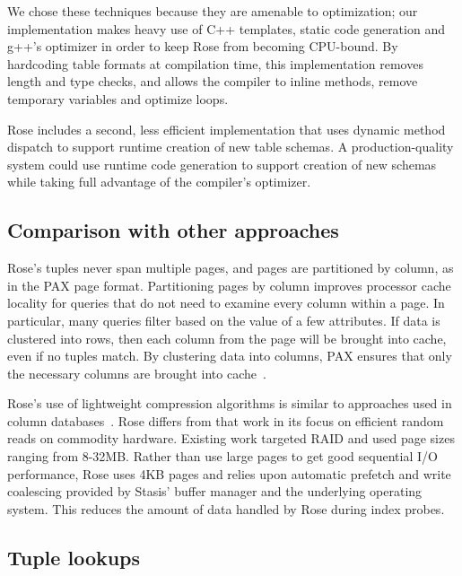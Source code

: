 \documentclass{vldb}
\newcommand{\rows}{Rose\xspace}
\newcommand{\rowss}{Rose's\xspace}
\begin{document}
We chose these techniques because they are amenable to optimization;
our implementation makes heavy use of C++ templates, static code
generation and g++'s optimizer in order to keep \rows from becoming
CPU-bound.  By hardcoding table formats at compilation time, this
implementation removes length and type checks, and allows the compiler
to inline methods, remove temporary variables and optimize loops.

\rows includes a second, less efficient implementation that uses
dynamic method dispatch to support runtime creation of new table
schemas.  A production-quality system could use runtime code
generation to support creation of new schemas while taking full
advantage of the compiler's optimizer.

\subsection{Comparison with other approaches}

\rowss tuples never span multiple pages, and pages are partitioned by
column, as in the PAX page format.  Partitioning pages by column
improves processor cache locality for queries that do not need to
examine every column within a page.  In particular, many queries
filter based on the value of a few attributes.  If data is clustered
into rows, then each column from the page will be brought into cache,
even if no tuples match.  By clustering data into columns, PAX ensures
that only the necessary columns are brought into cache~\cite{PAX}.

\rowss use of lightweight compression algorithms is similar to
approaches used in column databases~\cite{pfor}.  \rows differs from
that work in its focus on efficient random reads on commodity
hardware.  Existing work targeted RAID and used page sizes ranging from 8-32MB.  Rather
than use large pages to get good sequential I/O performance, \rows
uses 4KB pages and relies upon automatic prefetch and write coalescing
provided by Stasis' buffer manager and the underlying operating
system.  This reduces the amount of data handled by \rows during index
probes.

\subsection{Tuple lookups}
\end{document}
